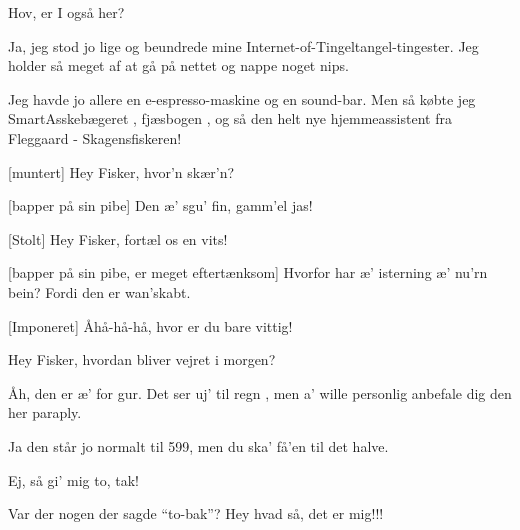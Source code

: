 \documentclass[a4paper,11pt]{article}
\begin{document}
\begin{sketch}


  

   Hov, er I også her?

   Ja, jeg stod jo lige og beundrede mine Internet-of-Tingeltangel-tingester. Jeg holder så meget af at gå på nettet og nappe noget nips.

   Jeg havde jo allere en e-espresso-maskine og en sound-bar. Men så købte jeg SmartAsskebægeret , fjæsbogen , og så den helt nye hjemmeassistent fra Fleggaard - Skagensfiskeren! 

  [muntert] Hey Fisker, hvor'n skær'n?


  [bapper på sin pibe] Den æ' sgu' fin, gamm'el jas!

  [Stolt] Hey Fisker, fortæl os en vits!

  [bapper på sin pibe, er meget eftertænksom] Hvorfor har æ' isterning
  æ' nu'rn bein?  Fordi den er wan'skabt.

  [Imponeret]  Åhå-hå-hå, hvor er du bare vittig!

   Hey Fisker, hvordan bliver vejret i morgen?

   Åh, den er æ' for gur. Det ser uj' til regn , men a' wille personlig anbefale dig den her paraply.


   Ja den står jo normalt til 599, men  du ska' få'en til det halve.


   Ej, så gi' mig to, tak!


  Var der nogen der sagde ``to-bak''? Hey hvad så, det er mig!!!


\end{sketch}
\end{document}
